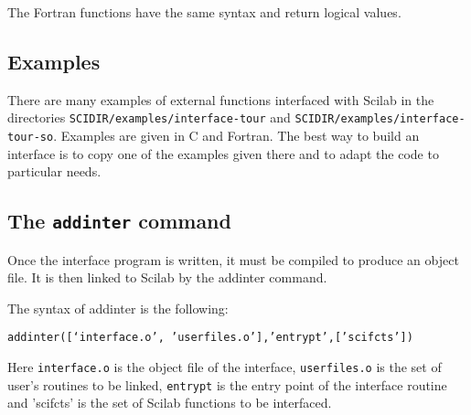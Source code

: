The Fortran functions have the same syntax and return logical values.
\subsection{Examples}
There are many examples of external functions interfaced with Scilab in
the directories \verb!SCIDIR/examples/interface-tour! and \newline
\verb!SCIDIR/examples/interface-tour-so!. 
Examples are given in C and Fortran. 
The best way to build an interface is to copy one of the examples
given there and to adapt the code to particular needs.


\subsection{The {\tt addinter} command}
Once the interface program is written, it must be compiled to produce 
an object file. It is then linked to Scilab by the addinter command.

The syntax of addinter is the following:

{\tt addinter([`interface.o', 'userfiles.o'],'entrypt',['scifcts'])}

Here {\tt interface.o} is the object file of the interface, 
{\tt userfiles.o} is the set of user's routines to be linked, 
{\tt entrypt} is the entry point of the interface routine and 
{'scifcts'} is the set of Scilab functions to be interfaced.


